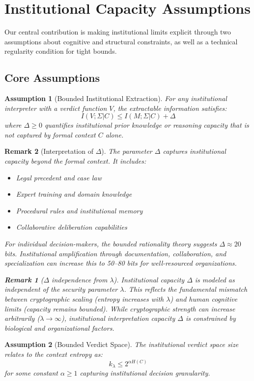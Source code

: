\documentclass{ieeeaccess}
\newtheorem{remark}{Remark}[subsection]
\newtheorem{assumption}{Assumption}[subsection]
\begin{document}
\section{Institutional Capacity Assumptions}\label{sec:assumptions}

Our central contribution is making institutional limits explicit through two assumptions about cognitive and structural constraints, as well as a technical regularity condition for tight bounds.

\subsection{Core Assumptions}

\begin{assumption}[Bounded Institutional Extraction]\label{ass:bound_extract}
For any institutional interpreter with a verdict function $V$, the extractable information satisfies:
\begin{equation}
I(V;\Sigma|C) \leq I(M;\Sigma|C) + \Delta
\end{equation}
where $\Delta \geq 0$ quantifies institutional prior knowledge or reasoning capacity that is not captured by formal context $C$ alone.
\end{assumption}

\begin{remark}[Interpretation of $\Delta$]
The parameter $\Delta$ captures institutional capacity beyond the formal context. It includes:
\begin{itemize}
\item Legal precedent and case law
\item Expert training and domain knowledge
\item Procedural rules and institutional memory
\item Collaborative deliberation capabilities
\end{itemize}
For individual decision-makers, the bounded rationality theory suggests $\Delta \approx 20$ bits. Institutional amplification through documentation, collaboration, and specialization can increase this to 50--80 bits for well-resourced organizations.

\begin{remark}[$\Delta$ independence from $\lambda$]
Institutional capacity $\Delta$ is modeled as independent of the security parameter $\lambda$. This reflects the fundamental mismatch between cryptographic scaling (entropy increases with $\lambda$) and human cognitive limits (capacity remains bounded). While cryptographic strength can increase arbitrarily ($\lambda \to \infty$), institutional interpretation capacity $\Delta$ is constrained by biological and organizational factors.
\end{remark}
\end{remark}
\begin{assumption}[Bounded Verdict Space]\label{ass:bound_verdict}
The institutional verdict space size relates to the context entropy as:
\begin{equation}
k_\lambda \leq 2^{\alpha H(C)}
\end{equation}
for some constant $\alpha \geq 1$ capturing institutional decision granularity.
\end{assumption}
\end{document}
